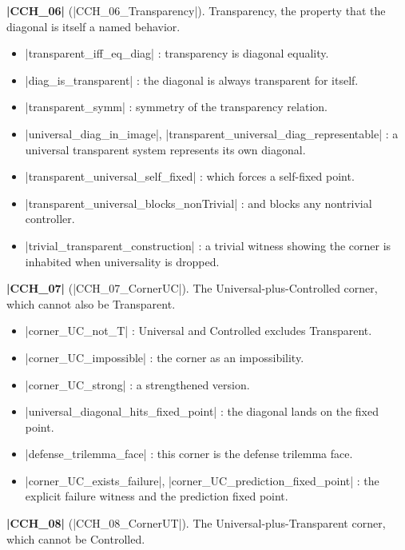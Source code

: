 \documentclass{memoir}
\begin{document}
\textbf{\LeanVerb|CCH_06|} (\LeanVerb|CCH_06_Transparency|). Transparency, the property that the diagonal is
itself a named behavior.

\begin{itemize}
\item \LeanVerb|transparent_iff_eq_diag| : transparency is diagonal equality.
\item \LeanVerb|diag_is_transparent| : the diagonal is always transparent for itself.
\item \LeanVerb|transparent_symm| : symmetry of the transparency relation.
\item \LeanVerb|universal_diag_in_image|, \LeanVerb|transparent_universal_diag_representable| : a
   universal transparent system represents its own diagonal.
\item \LeanVerb|transparent_universal_self_fixed| : which forces a self-fixed point.
\item \LeanVerb|transparent_universal_blocks_nonTrivial| : and blocks any nontrivial controller.
\item \LeanVerb|trivial_transparent_construction| : a trivial witness showing the corner is
   inhabited when universality is dropped.

\end{itemize}


\textbf{\LeanVerb|CCH_07|} (\LeanVerb|CCH_07_CornerUC|). The Universal-plus-Controlled corner, which cannot
also be Transparent.

\begin{itemize}
\item \LeanVerb|corner_UC_not_T| : Universal and Controlled excludes Transparent.
\item \LeanVerb|corner_UC_impossible| : the corner as an impossibility.
\item \LeanVerb|corner_UC_strong| : a strengthened version.
\item \LeanVerb|universal_diagonal_hits_fixed_point| : the diagonal lands on the fixed point.
\item \LeanVerb|defense_trilemma_face| : this corner is the defense trilemma face.
\item \LeanVerb|corner_UC_exists_failure|, \LeanVerb|corner_UC_prediction_fixed_point| : the explicit
   failure witness and the prediction fixed point.

\end{itemize}


\textbf{\LeanVerb|CCH_08|} (\LeanVerb|CCH_08_CornerUT|). The Universal-plus-Transparent corner, which cannot
be Controlled.
\end{document}
